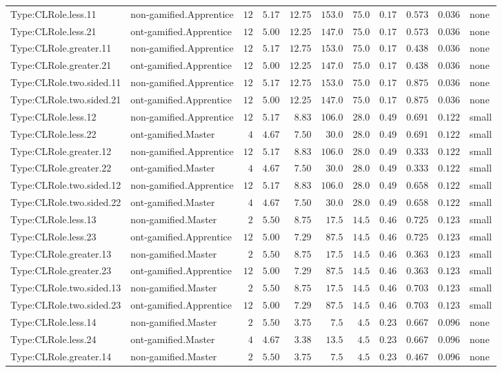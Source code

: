 \documentclass[6pt,a4paper]{article}
\begin{document}
{\begin{longtable}{llrrrrrrrrl}
Type:CLRole.less.11&non-gamified.Apprentice&$12$&$5.17$&$12.75$&$153.0$&$ 75.0$&$ 0.17$&$0.573$&$0.036$&none\tabularnewline
Type:CLRole.less.21&ont-gamified.Apprentice&$12$&$5.00$&$12.25$&$147.0$&$ 75.0$&$ 0.17$&$0.573$&$0.036$&none\tabularnewline
Type:CLRole.greater.11&non-gamified.Apprentice&$12$&$5.17$&$12.75$&$153.0$&$ 75.0$&$ 0.17$&$0.438$&$0.036$&none\tabularnewline
Type:CLRole.greater.21&ont-gamified.Apprentice&$12$&$5.00$&$12.25$&$147.0$&$ 75.0$&$ 0.17$&$0.438$&$0.036$&none\tabularnewline
Type:CLRole.two.sided.11&non-gamified.Apprentice&$12$&$5.17$&$12.75$&$153.0$&$ 75.0$&$ 0.17$&$0.875$&$0.036$&none\tabularnewline
Type:CLRole.two.sided.21&ont-gamified.Apprentice&$12$&$5.00$&$12.25$&$147.0$&$ 75.0$&$ 0.17$&$0.875$&$0.036$&none\tabularnewline
Type:CLRole.less.12&non-gamified.Apprentice&$12$&$5.17$&$ 8.83$&$106.0$&$ 28.0$&$ 0.49$&$0.691$&$0.122$&small\tabularnewline
Type:CLRole.less.22&ont-gamified.Master&$ 4$&$4.67$&$ 7.50$&$ 30.0$&$ 28.0$&$ 0.49$&$0.691$&$0.122$&small\tabularnewline
Type:CLRole.greater.12&non-gamified.Apprentice&$12$&$5.17$&$ 8.83$&$106.0$&$ 28.0$&$ 0.49$&$0.333$&$0.122$&small\tabularnewline
Type:CLRole.greater.22&ont-gamified.Master&$ 4$&$4.67$&$ 7.50$&$ 30.0$&$ 28.0$&$ 0.49$&$0.333$&$0.122$&small\tabularnewline
Type:CLRole.two.sided.12&non-gamified.Apprentice&$12$&$5.17$&$ 8.83$&$106.0$&$ 28.0$&$ 0.49$&$0.658$&$0.122$&small\tabularnewline
Type:CLRole.two.sided.22&ont-gamified.Master&$ 4$&$4.67$&$ 7.50$&$ 30.0$&$ 28.0$&$ 0.49$&$0.658$&$0.122$&small\tabularnewline
Type:CLRole.less.13&non-gamified.Master&$ 2$&$5.50$&$ 8.75$&$ 17.5$&$ 14.5$&$ 0.46$&$0.725$&$0.123$&small\tabularnewline
Type:CLRole.less.23&ont-gamified.Apprentice&$12$&$5.00$&$ 7.29$&$ 87.5$&$ 14.5$&$ 0.46$&$0.725$&$0.123$&small\tabularnewline
Type:CLRole.greater.13&non-gamified.Master&$ 2$&$5.50$&$ 8.75$&$ 17.5$&$ 14.5$&$ 0.46$&$0.363$&$0.123$&small\tabularnewline
Type:CLRole.greater.23&ont-gamified.Apprentice&$12$&$5.00$&$ 7.29$&$ 87.5$&$ 14.5$&$ 0.46$&$0.363$&$0.123$&small\tabularnewline
Type:CLRole.two.sided.13&non-gamified.Master&$ 2$&$5.50$&$ 8.75$&$ 17.5$&$ 14.5$&$ 0.46$&$0.703$&$0.123$&small\tabularnewline
Type:CLRole.two.sided.23&ont-gamified.Apprentice&$12$&$5.00$&$ 7.29$&$ 87.5$&$ 14.5$&$ 0.46$&$0.703$&$0.123$&small\tabularnewline
Type:CLRole.less.14&non-gamified.Master&$ 2$&$5.50$&$ 3.75$&$  7.5$&$  4.5$&$ 0.23$&$0.667$&$0.096$&none\tabularnewline
Type:CLRole.less.24&ont-gamified.Master&$ 4$&$4.67$&$ 3.38$&$ 13.5$&$  4.5$&$ 0.23$&$0.667$&$0.096$&none\tabularnewline
Type:CLRole.greater.14&non-gamified.Master&$ 2$&$5.50$&$ 3.75$&$  7.5$&$  4.5$&$ 0.23$&$0.467$&$0.096$&none\tabularnewline

\end{longtable}}
\end{document}
